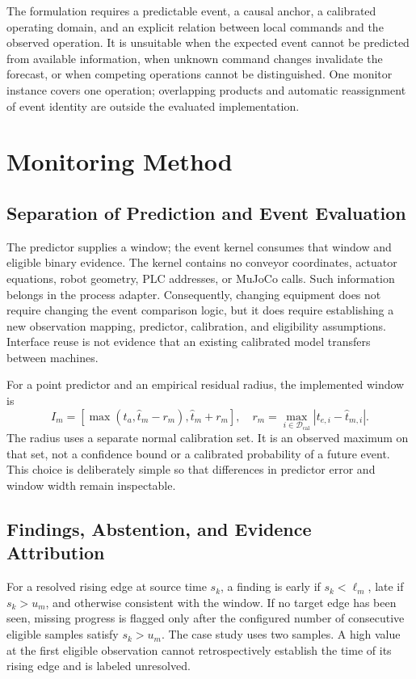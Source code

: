 The formulation requires a predictable event, a causal anchor, a calibrated operating domain, and an explicit relation between local commands and the observed operation. It is unsuitable when the expected event cannot be predicted from available information, when unknown command changes invalidate the forecast, or when competing operations cannot be distinguished. One monitor instance covers one operation; overlapping products and automatic reassignment of event identity are outside the evaluated implementation.

\section{Monitoring Method}
\subsection{Separation of Prediction and Event Evaluation}
The predictor supplies a window; the event kernel consumes that window and eligible binary evidence. The kernel contains no conveyor coordinates, actuator equations, robot geometry, PLC addresses, or MuJoCo calls. Such information belongs in the process adapter. Consequently, changing equipment does not require changing the event comparison logic, but it does require establishing a new observation mapping, predictor, calibration, and eligibility assumptions. Interface reuse is not evidence that an existing calibrated model transfers between machines.

For a point predictor and an empirical residual radius, the implemented window is
\begin{equation}
 I_m=[\max(t_a,\widehat t_m-r_m),\widehat t_m+r_m],\quad
 r_m=\max_{i\in\mathcal D_{\mathrm{cal}}}|t_{e,i}-\widehat t_{m,i}|.
\end{equation}
The radius uses a separate normal calibration set. It is an observed maximum on that set, not a confidence bound or a calibrated probability of a future event. This choice is deliberately simple so that differences in predictor error and window width remain inspectable.

\subsection{Findings, Abstention, and Evidence Attribution}
For a resolved rising edge at source time $s_k$, a finding is early if $s_k<\ell_m$, late if $s_k>u_m$, and otherwise consistent with the window. If no target edge has been seen, missing progress is flagged only after the configured number of consecutive eligible samples satisfy $s_k>u_m$. The case study uses two samples. A high value at the first eligible observation cannot retrospectively establish the time of its rising edge and is labeled unresolved.


